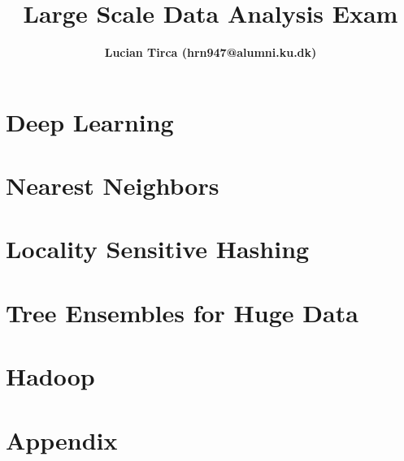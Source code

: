 \documentclass{article}
\begin{document}
\title{\textbf{Large Scale Data Analysis Exam}}
\author{\textbf{Lucian Tirca (hrn947@alumni.ku.dk)}}
\maketitle


\section{Deep Learning}



\section{Nearest Neighbors}



\section{Locality Sensitive Hashing}



\section{Tree Ensembles for Huge Data}


\section{Hadoop}



\section*{Appendix} 


\printbibliography
\end{document}
